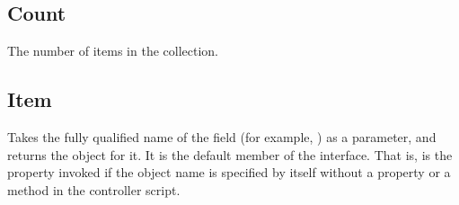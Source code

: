 \documentclass[letterpaper,12pt,english,openany,oneside]{sphinxmanual}
\begin{document}
\subsection{Count}
\label{\detokenize{IAC_API_FormsIntro:count}}
The number of items in the collection.

\label{\detokenize{IAC_API_FormsIntro:syntax-40}}

\begin{sphinxVerbatim}[commandchars=\\\{\}]
\PYG{p}{[}\PYG{p}{]} 
\end{sphinxVerbatim}
\label{\detokenize{IAC_API_FormsIntro:example-27}}

\begin{sphinxVerbatim}[commandchars=\\\{\}]
   
   

  

    
  
 
 
 
\end{sphinxVerbatim}




\subsection{Item}
\label{\detokenize{IAC_API_FormsIntro:item}}
Takes the fully qualified name of the field (for example, ) as a parameter, and returns the  object for it. It is the default member of the  interface. That is,  is the property invoked if the object name is specified by itself without a property or a method in the controller script.

\label{\detokenize{IAC_API_FormsIntro:syntax-41}}

\begin{sphinxVerbatim}[commandchars=\\\{\}]
\PYG{p}{[}\PYG{p}{]} 
\end{sphinxVerbatim}
\label{\detokenize{IAC_API_FormsIntro:example-28}}
\end{document}
